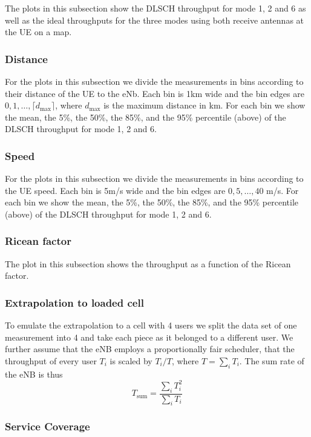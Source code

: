 \documentclass[a4paper,10pt]{article}
\begin{document}
The plots in this subsection show the DLSCH throughput for mode 1, 2 and 6 as well as the ideal throughputs for the three modes using  both receive antennas at the UE on a map.

\subsubsection{Distance}

For the plots in this subsection we divide the measurements in bins according to their distance of the UE to the eNb. Each bin is 1km wide and the bin edges are $0, 1, \ldots, \lceil d_{\max} \rceil$, where $d_{\max}$ is the maximum distance in km. For each bin we show the mean, the 5\%, the 50\%, the 85\%, and the 95\% percentile (above) of the DLSCH throughput for mode 1, 2 and 6. 

\subsubsection{Speed}

For the plots in this subsection we divide the measurements in bins according to the UE speed. Each bin is 5m/s wide and the bin edges are $0,5,\ldots,40$ m/s. For each bin we show the mean, the 5\%, the 50\%, the 85\%, and the 95\% percentile (above) of the DLSCH throughput for mode 1, 2 and 6. 

\subsubsection{Ricean factor}

The plot in this subsection shows the throughput as a function of the Ricean factor.

\subsubsection{Extrapolation to loaded cell}

To emulate the extrapolation to a cell with 4 users we split the data set of one measurement into 4 and take each piece as it belonged to a different user. We further assume that the eNB employs a proportionally fair scheduler, that the throughput of every user $T_i$ is scaled by $T_i/T$, where $T=\sum_i T_i$. The sum rate of the eNB is thus
\begin{equation}
 T_{\mathrm{sum}} = \frac{\sum_i T_i^2}{\sum_i T_i}
\end{equation}

\subsubsection{Service Coverage}
\end{document}
